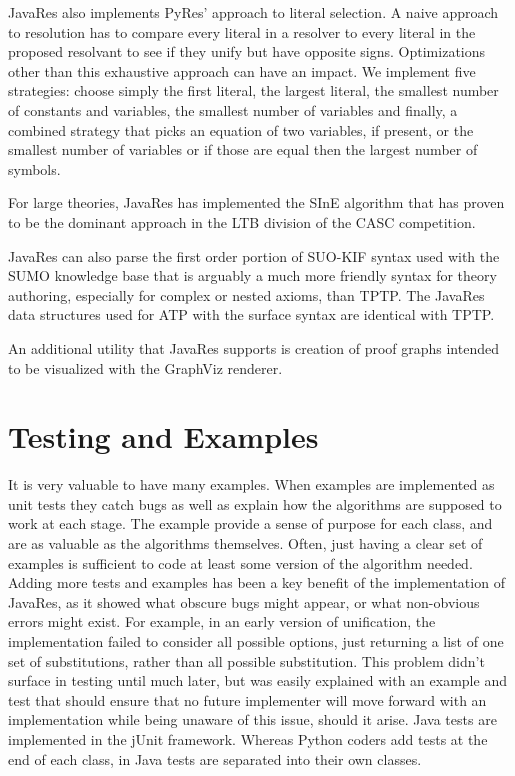 \documentclass{llncs}
\begin{document}
JavaRes also implements PyRes' approach to literal selection.  A naive
approach to resolution has to compare every literal in a resolver to
every literal in the proposed resolvant to see if they unify but have
opposite signs.  Optimizations other than this exhaustive approach can
have an impact.  We implement five strategies: choose simply the first
literal, the largest literal, the smallest number of constants and
variables, the smallest number of variables and finally, a combined
strategy that picks an equation of two variables, if present, or the
smallest number of variables or if those are equal then the largest
number of symbols.

For large theories, JavaRes has implemented the SInE
algorithm\cite{HV:CADE-2011} that has proven to be the dominant approach in the
LTB division of the CASC competition.

JavaRes can also parse the first order portion of SUO-KIF syntax used
with the SUMO knowledge base that is arguably a much more friendly
syntax for theory authoring, especially for complex or nested axioms,
than TPTP.  The JavaRes data structures used for ATP with the surface
syntax are identical with TPTP.

An additional utility that JavaRes supports is creation of proof
graphs intended to be visualized with the GraphViz renderer.

\section{Testing and Examples}

It is very valuable to have many examples.  When examples are implemented as
unit tests they catch bugs as well as explain how the algorithms are supposed to work at each stage.
The example provide a sense of purpose for each class, and are as valuable as the algorithms
themselves.  Often, just having a clear set of examples is sufficient to code at least some version
of the algorithm needed.  Adding more tests and examples has been a key benefit of the implementation
of JavaRes, as it showed what obscure bugs might appear, or what non-obvious errors might exist.
For example, in an early version of unification, the implementation failed to consider all possible
options, just returning a list of one set of substitutions, rather than all possible substitution.
This problem didn't surface in testing until much later, but was easily explained with an example and
test that should ensure that no future implementer will move forward with an implementation while
being unaware of this issue, should it arise.  Java tests are implemented in the jUnit framework.
Whereas Python coders add tests at the end of each class, in Java tests are separated into their
own classes.
\end{document}
